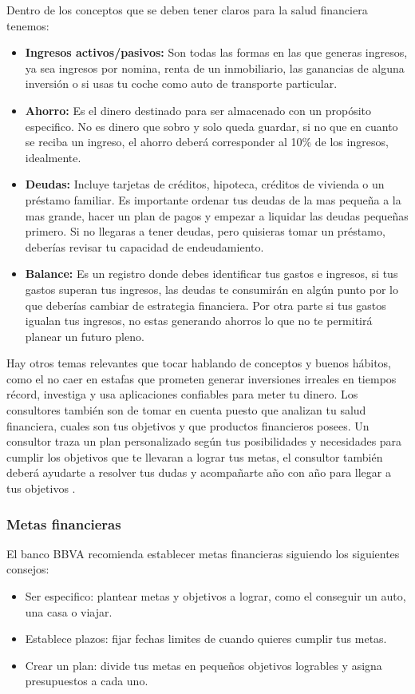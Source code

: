 Dentro de los conceptos que se deben tener claros para la salud financiera tenemos:
\begin{itemize}
    \item \textbf{Ingresos activos/pasivos:} Son todas las formas en las que generas ingresos, ya sea ingresos por nomina, renta de un inmobiliario, las ganancias de alguna 
    inversión o si usas tu coche como auto de transporte particular.
    \item \textbf{Ahorro:} Es el dinero destinado para ser almacenado con un propósito especifico. No es dinero que sobro y solo queda guardar, si no que en cuanto se reciba 
    un ingreso, el ahorro deberá corresponder al 10\% de los ingresos, idealmente.
    \item \textbf{Deudas:} Incluye tarjetas de créditos, hipoteca, créditos de vivienda o un préstamo familiar. Es importante ordenar tus deudas de la mas pequeña a la mas 
    grande, hacer un plan de pagos y empezar a liquidar las deudas pequeñas primero.
    Si no llegaras a tener deudas, pero quisieras tomar un préstamo, deberías revisar tu capacidad de endeudamiento.
    \item \textbf{Balance:} Es un registro donde debes identificar tus gastos e ingresos, si tus gastos superan tus ingresos, las deudas te consumirán en algún punto por 
    lo que deberías cambiar de estrategia financiera. Por otra parte si tus gastos igualan tus ingresos, no estas generando ahorros lo que no te permitirá planear un futuro 
    pleno.
\end{itemize}
Hay otros temas relevantes que tocar hablando de conceptos y buenos hábitos, como el no caer en estafas que prometen generar inversiones irreales en tiempos récord, 
investiga y usa aplicaciones confiables para meter tu dinero. Los consultores también son de tomar en cuenta puesto que analizan tu salud financiera, cuales son tus 
objetivos y que productos financieros posees. Un consultor traza un plan personalizado según tus posibilidades y necesidades para cumplir los objetivos que te llevaran 
a lograr tus metas, el consultor también deberá ayudarte a resolver tus dudas y acompañarte año con año para llegar a tus objetivos \cite{BBVA Finanzas}\cite{Coral Prous}.


    \subsubsection{Metas financieras}
    El banco BBVA recomienda establecer metas financieras siguiendo los siguientes consejos: \cite{BBVA Finanzas}
    \begin{itemize}
        \item Ser especifico: plantear metas y objetivos a lograr, como el conseguir un auto, una casa o viajar.
        \item Establece plazos: fijar fechas limites de cuando quieres cumplir tus metas.
        \item Crear un plan: divide tus metas en pequeños objetivos logrables y asigna presupuestos a cada uno.
    \end{itemize}
    
